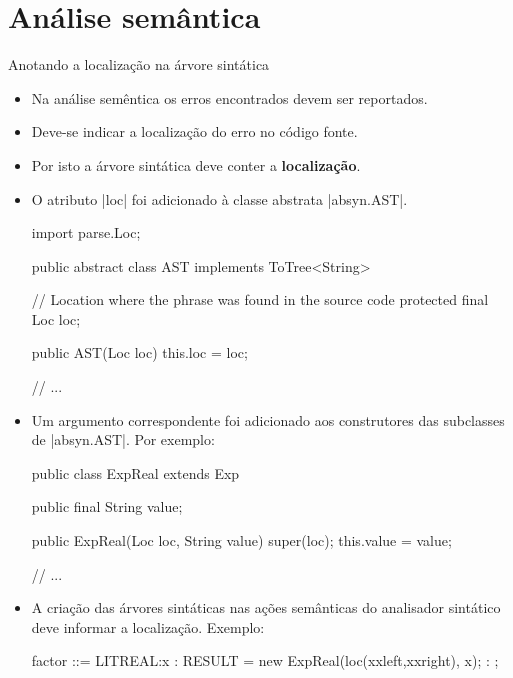 \documentclass[smaller]{beamer}
\begin{document}
\section{Análise semântica}

\begin{frame}{Anotando a localização na árvore sintática}
  \begin{itemize}
    \item Na análise semêntica os erros encontrados devem ser
    reportados.

    \item Deve-se indicar a localização do erro no código fonte.

    \item Por isto a árvore sintática deve conter a
    \textbf{localização}.

    \item O atributo \pyginline|loc| foi adicionado à classe abstrata
    \pyginline|absyn.AST|.
\begin{pygmented}[]
import parse.Loc;

public abstract class AST implements ToTree<String> {

   // Location where the phrase was found in the source code
   protected final Loc loc;

   public AST(Loc loc) {
      this.loc = loc;
   }

   // ...
}
\end{pygmented}

    \framebreak
    
    \item Um argumento correspondente foi adicionado aos construtores
    das subclasses de \pyginline|absyn.AST|. Por exemplo:
\begin{pygmented}[]
public class ExpReal extends Exp {

   public final String value;

   public ExpReal(Loc loc, String value) {
      super(loc);
      this.value = value;
   }

   // ...
}
\end{pygmented}

    \framebreak

    \item A criação das árvores sintáticas nas ações semânticas do
    analisador sintático deve informar a localização. Exemplo:
\begin{pygmented}[]
factor ::=
  LITREAL:x {: RESULT = new ExpReal(loc(xxleft,xxright), x); :}
;
\end{pygmented}


\end{itemize}
\end{frame}
\end{document}
